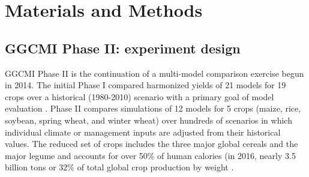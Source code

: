 \documentclass[preprint, 5p, times, twocolumn]{elsarticle}
\begin{document}
\section{Materials and Methods}
\label{S:2}
\subsection{GGCMI Phase II: experiment design}
GGCMI Phase II is the continuation of a multi-model comparison exercise begun in 2014. The initial Phase I compared harmonized yields of 21 models for 19 crops over a historical (1980-2010) scenario with a primary goal of model evaluation \citep{Elliott2015, muller_global_2017}. Phase II compares simulations of 12 models for 5 crops (maize, rice, soybean, spring wheat, and winter wheat) over hundreds of scenarios in which individual climate or management inputs are adjusted from their historical values. The reduced set of crops includes the three major global cereals and the major legume and accounts for over 50\% of human calories (in 2016, nearly 3.5 billion tons or 32\% of total global crop production by weight \citep{FAOSTAT}. 
\end{document}
